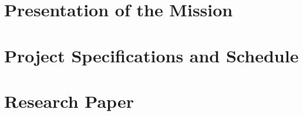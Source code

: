 \documentclass[10pt]{article}
\title{\mytitle}
\author{\myauthor}
\date{}
\begin{document}
    

    


    \section{Presentation of the Mission}\label{sec:presentation-of-the-mission}
    


    \section{Project Specifications and Schedule}\label{sec:project-specifications-and-schedule}
    


    \section{Research Paper}\label{sec:research-paper}
    

    

    
\end{document}

